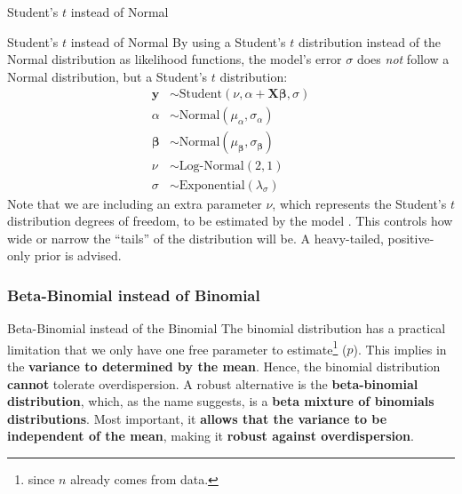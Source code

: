 \begin{frame}{Student's $t$ instead of Normal}
	\centering
\end{frame}

\begin{frame}{Student's $t$ instead of Normal}
	By using a Student's $t$ distribution instead of the Normal distribution
	as likelihood functions,
	the model's error $\sigma$ does \textit{not} follow a Normal distribution,
	but a Student's $t$ distribution:
	$$
		\begin{aligned}
			\mathbf{y}         & \sim \text{Student}\left( \nu, \alpha + \mathbf{X} \boldsymbol{\beta}, \sigma \right) \\
			\alpha             & \sim \text{Normal}(\mu_\alpha, \sigma_\alpha)                                         \\
			\boldsymbol{\beta} & \sim \text{Normal}(\mu_{\boldsymbol{\beta}}, \sigma_{\boldsymbol{\beta}})             \\
			\nu                & \sim \text{Log-Normal}(2, 1)                                                          \\
			\sigma             & \sim \text{Exponential}(\lambda_\sigma)
		\end{aligned}
	$$
	\small
	Note that we are including an extra parameter $\nu$,
	which represents the Student's $t$ distribution degrees of freedom,
	to be estimated by the model \parencite{gelman2013bayesian}.
	This controls how wide or narrow the ``tails'' of the distribution will be.
	A heavy-tailed, positive-only prior is advised.
\end{frame}

\subsubsection{Beta-Binomial instead of Binomial}
\begin{frame}{Beta-Binomial instead of the Binomial}
	The binomial distribution has a practical limitation that we only have
	one free parameter to estimate\footnote{since $n$ already comes from data.} ($p$).
	This implies in the \textbf{variance to determined by the mean}.
	Hence, the binomial distribution \textbf{cannot} tolerate overdispersion.
	\vfill
	A robust alternative is the \textbf{beta-binomial distribution}, which,
	as the name suggests, is a \textbf{beta mixture of binomials distributions}.
	Most important, it \textbf{allows that the variance to be independent of the mean},
	making it \textbf{robust against overdispersion}.
\end{frame}

